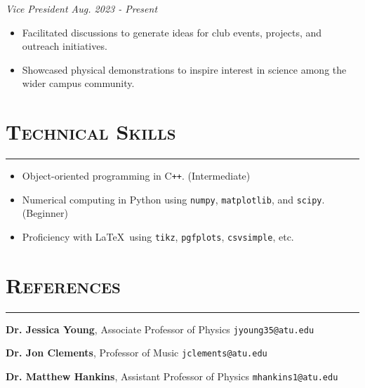 \documentclass{article}
\newcommand{\rSection}[2]{
    \section*{\textbf{#1}\bfseries\scshape{#2}}\hrule
}
\begin{document}
\vspace{-2mm}
\emph{Vice President \hfill Aug. 2023 - Present}

\begin{itemize}
    \item Facilitated discussions to generate ideas for club events, projects, and outreach initiatives.
    \item Showcased physical demonstrations to inspire interest in science among the wider campus community.
\end{itemize}



\rSection{T}{echnical Skills}

\begin{itemize}
    \item Object-oriented programming in C\texttt{++}. (Intermediate)
    \item Numerical computing in Python using \verb|numpy|, \verb|matplotlib|, and \verb|scipy|. (Beginner)
    \item Proficiency with \LaTeX \ using \verb|tikz|, \verb|pgfplots|, \verb|csvsimple|, etc.
\end{itemize}




\rSection{R}{eferences}
\textbf{Dr. Jessica Young}, Associate Professor of Physics \hfill \verb|jyoung35@atu.edu|

\textbf{Dr. Jon Clements}, Professor of Music \hfill \verb|jclements@atu.edu|

\textbf{Dr. Matthew Hankins}, Assistant Professor of Physics \hfill \verb|mhankins1@atu.edu|
\end{document}
